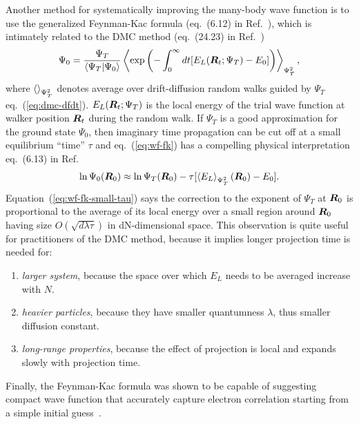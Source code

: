 Another method for systematically improving the many-body wave function is to use the generalized Feynman-Kac formula (eq.~(6.12) in Ref.~\cite{Martin2016}), which is intimately related to the DMC method (eq.~(24.23) in Ref.~\cite{Martin2016})
\begin{align} \label{eq:wf-fk}
\Psi_0 = \dfrac{\Psi_T}{\braket{\Psi_T|\Psi_0}}\left\langle
\exp\left(
-\int_0^\infty dt [E_L(\boldsymbol{R}_t;\Psi_T)-E_0]
\right)
\right\rangle_{\Psi_T^2},
\end{align}
where $\braket{}_{\Psi_T^2}$ denotes average over drift-diffusion random walks guided by $\Psi_T$ eq.~(\ref{eq:dmc-dfdt}). $E_L(\boldsymbol{R}_t;\Psi_T)$ is the local energy of the trial wave function at walker position $\boldsymbol{R}_t$ during the random walk. If $\Psi_T$ is a good approximation for the ground state $\Psi_0$, then imaginary time propagation can be cut off at a small equilibrium ``time'' $\tau$ and eq.~(\ref{eq:wf-fk}) has a compelling physical interpretation eq.~(6.13) in Ref.~\cite{Martin2016}
\begin{align} \label{eq:wf-fk-small-tau}
\ln\Psi_0(\boldsymbol{R}_0) \approx \ln\Psi_T(\boldsymbol{R}_0) - \tau [
\left\langle E_L\right\rangle_{\Psi_T^2}(\boldsymbol{R}_0) - E_0
].
\end{align}
Equation~(\ref{eq:wf-fk-small-tau}) says the correction to the exponent of $\Psi_T$ at $\boldsymbol{R}_0$ is proportional to the average of its local energy over a small region around $\boldsymbol{R}_0$ having size $O(\sqrt{d \lambda\tau})$ in dN-dimensional space. This observation is quite useful for practitioners of the DMC method, because it implies longer projection time is needed for:
\begin{enumerate}
\item \textit{larger system}, because the space over which $E_L$ needs to be averaged increase with $N$.
\item \textit{heavier particles}, because they have smaller quantumness $\lambda$, thus smaller diffusion constant.
\item \textit{long-range properties}, because the effect of projection is local and expands slowly with projection time.
\end{enumerate}

Finally, the Feynman-Kac formula was shown to be capable of suggesting compact wave function that accurately capture electron correlation starting from a simple initial guess~\cite{Holzmann2003}.
